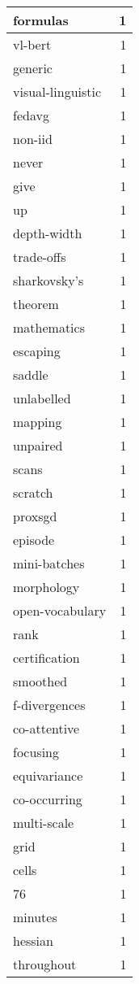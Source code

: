 \begin{table}[h]
\begin{tabular}{|l|r|}
\hline
formulas & 1 \\
\hline
vl-bert & 1 \\
\hline
generic & 1 \\
\hline
visual-linguistic & 1 \\
\hline
fedavg & 1 \\
\hline
non-iid & 1 \\
\hline
never & 1 \\
\hline
give & 1 \\
\hline
up & 1 \\
\hline
depth-width & 1 \\
\hline
trade-offs & 1 \\
\hline
sharkovsky's & 1 \\
\hline
theorem & 1 \\
\hline
mathematics & 1 \\
\hline
escaping & 1 \\
\hline
saddle & 1 \\
\hline
unlabelled & 1 \\
\hline
mapping & 1 \\
\hline
unpaired & 1 \\
\hline
scans & 1 \\
\hline
scratch & 1 \\
\hline
proxsgd & 1 \\
\hline
episode & 1 \\
\hline
mini-batches & 1 \\
\hline
morphology & 1 \\
\hline
open-vocabulary & 1 \\
\hline
rank & 1 \\
\hline
certification & 1 \\
\hline
smoothed & 1 \\
\hline
f-divergences & 1 \\
\hline
co-attentive & 1 \\
\hline
focusing & 1 \\
\hline
equivariance & 1 \\
\hline
co-occurring & 1 \\
\hline
multi-scale & 1 \\
\hline
grid & 1 \\
\hline
cells & 1 \\
\hline
76 & 1 \\
\hline
minutes & 1 \\
\hline
hessian & 1 \\
\hline
throughout & 1 \\
\hline

\end{tabular}
\end{table}
